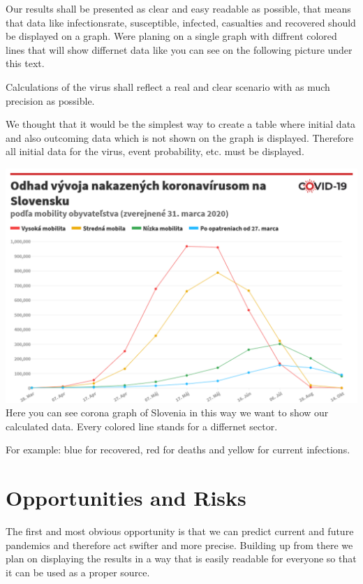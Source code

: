 \documentclass[12pt]{article}
\theoremstyle{definition}
\begin{document}
Our results shall be presented as clear and easy readable as possible, 
that means that data like infectionsrate, susceptible, infected, casualties and recovered should be displayed on a graph.
Were planing on a single graph with diffrent colored lines that will show differnet data like you can see on the following picture under this text.

Calculations of the virus shall reflect a real and clear scenario with as much precision as possible.

We thought that it would be the simplest way to create a table where initial data and also outcoming data which is not shown on the graph is displayed. 
Therefore all initial data for the virus, event probability, etc. must be displayed.

\includegraphics[width=\textwidth]{graph.png}\\[2em]
Here you can see corona graph of Slovenia in this way we want to show our calculated data. Every colored line stands for a differnet sector.

For example: blue for recovered, red for deaths and yellow for current infections.

\pagebreak
\section{Opportunities and Risks}

The first and most obvious opportunity is that we can predict current and future pandemics and therefore act swifter and more precise.
Building up from there we plan on displaying the results in a way that is easily readable for everyone so that it can be used as a proper source.
\end{document}
